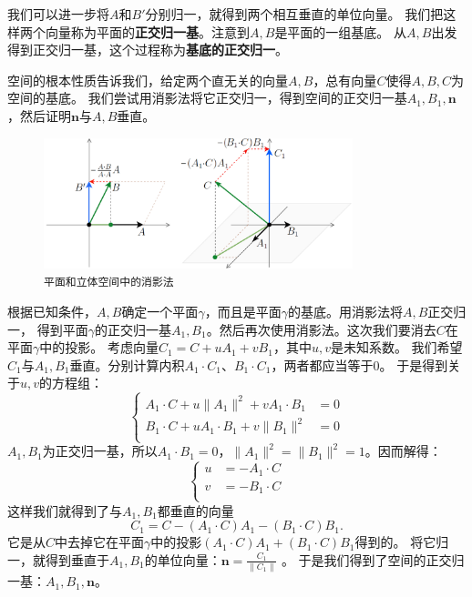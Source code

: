 \documentclass[12pt,UTF8]{ctexbook}
\begin{document}
我们可以进一步将$A$和$B'$分别归一，就得到两个相互垂直的单位向量。
我们把这样两个向量称为平面的\textbf{正交归一基}。注意到$A,B$是平面的一组基底。
从$A,B$出发得到正交归一基，这个过程称为\textbf{基底的正交归一}。

空间的根本性质告诉我们，给定两个直无关的向量$A,B$，总有向量$C$使得$A,B,C$为空间的基底。
我们尝试用消影法将它正交归一，得到空间的正交归一基$A_1,B_1,\mathbf{n}$，然后证明$\mathbf{n}$与$A,B$垂直。

\begin{figure}[h] 
    \centering
    \includegraphics[width=0.8\textwidth]{消影法1.png}
    \caption*{\texttt{平面和立体空间中的消影法}}
\end{figure}

根据已知条件，$A,B$确定一个平面$\gamma$，而且是平面$\gamma$的基底。用消影法将$A,B$正交归一，
得到平面$\gamma$的正交归一基$A_1,B_1$。然后再次使用消影法。这次我们要消去$C$在平面$\gamma$中的投影。
考虑向量$C_1=C+uA_1+vB_1$，其中$u,v$是未知系数。
我们希望$C_1$与$A_1,B_1$垂直。分别计算内积$A_1\cdot C_1$、$B_1\cdot C_1$，两者都应当等于$0$。
于是得到关于$u,v$的方程组：
$$
    \left\{
    \begin{array}{cl}
    A_1\cdot C + u\|A_1\|^2 + vA_1\cdot B_1 &= 0 \\
    B_1\cdot C + uA_1\cdot B_1 + v\|B_1\|^2 &= 0 \\
    \end{array}
    \right.
$$
$A_1,B_1$为正交归一基，所以$A_1\cdot B_1 = 0$，$\|A_1\|^2 = \|B_1\|^2 = 1$。因而解得：
$$
    \left\{
    \begin{array}{cl}
    u &= -A_1\cdot C \\
    v &= -B_1\cdot C \\
    \end{array}
    \right.
$$
这样我们就得到了与$A_1,B_1$都垂直的向量
$$ C_1 = C - (A_1\cdot C)A_1 - (B_1\cdot C)B_1. $$
它是从$C$中去掉它在平面$\gamma$中的投影$(A_1\cdot C)A_1 + (B_1\cdot C)B_1$得到的。
将它归一，就得到垂直于$A_1,B_1$的单位向量：$\mathbf{n} = \frac{C_1}{\|C_1\|}$ 。
于是我们得到了空间的正交归一基：$A_1,B_1,\mathbf{n}$。
\end{document}
